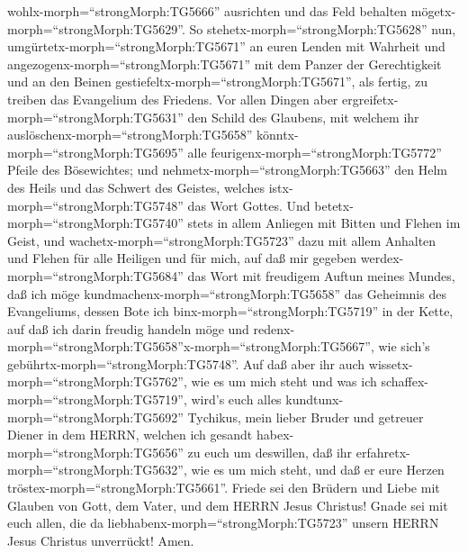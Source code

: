 wohlx-morph=``strongMorph:TG5666'' ausrichten und das Feld behalten
mögetx-morph=``strongMorph:TG5629''.  So
stehetx-morph=``strongMorph:TG5628'' nun,
umgürtetx-morph=``strongMorph:TG5671'' an euren Lenden mit Wahrheit und
angezogenx-morph=``strongMorph:TG5671'' mit dem Panzer der Gerechtigkeit
 und an den Beinen
gestiefeltx-morph=``strongMorph:TG5671'', als fertig, zu treiben das
Evangelium des Friedens.  Vor allen Dingen aber
ergreifetx-morph=``strongMorph:TG5631'' den Schild des Glaubens, mit
welchem ihr auslöschenx-morph=``strongMorph:TG5658''
könntx-morph=``strongMorph:TG5695'' alle
feurigenx-morph=``strongMorph:TG5772'' Pfeile des Bösewichtes;
 und nehmetx-morph=``strongMorph:TG5663'' den Helm des
Heils und das Schwert des Geistes, welches
istx-morph=``strongMorph:TG5748'' das Wort Gottes.  Und
betetx-morph=``strongMorph:TG5740'' stets in allem Anliegen mit Bitten
und Flehen im Geist, und wachetx-morph=``strongMorph:TG5723'' dazu mit
allem Anhalten und Flehen für alle Heiligen  und für mich,
auf daß mir gegeben werdex-morph=``strongMorph:TG5684'' das Wort mit
freudigem Auftun meines Mundes, daß ich möge
kundmachenx-morph=``strongMorph:TG5658'' das Geheimnis des Evangeliums,
 dessen Bote ich binx-morph=``strongMorph:TG5719'' in der
Kette, auf daß ich darin freudig handeln möge und
redenx-morph=``strongMorph:TG5658''x-morph=``strongMorph:TG5667'', wie
sich's gebührtx-morph=``strongMorph:TG5748''.  Auf daß aber
ihr auch wissetx-morph=``strongMorph:TG5762'', wie es um mich steht und
was ich schaffex-morph=``strongMorph:TG5719'', wird's euch alles
kundtunx-morph=``strongMorph:TG5692'' Tychikus, mein lieber Bruder und
getreuer Diener in dem HERRN,  welchen ich gesandt
habex-morph=``strongMorph:TG5656'' zu euch um deswillen, daß ihr
erfahretx-morph=``strongMorph:TG5632'', wie es um mich steht, und daß er
eure Herzen tröstex-morph=``strongMorph:TG5661''.  Friede
sei den Brüdern und Liebe mit Glauben von Gott, dem Vater, und dem HERRN
Jesus Christus!  Gnade sei mit euch allen, die da
liebhabenx-morph=``strongMorph:TG5723'' unsern HERRN Jesus Christus
unverrückt! Amen.
